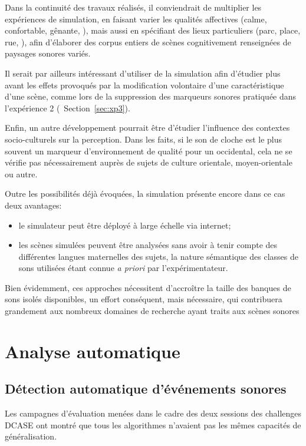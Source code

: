 Dans la continuité des travaux réalisés, il conviendrait de multiplier les expériences de simulation, en faisant varier les qualités affectives (calme, confortable, gênante, \etc), mais aussi en spécifiant des lieux particuliers (parc, place, rue, \etc), afin d'élaborer des corpus entiers de scènes cognitivement renseignées de paysages sonores variés. 

Il serait par ailleurs intéressant d'utiliser de la simulation afin d'étudier plus avant les effets provoqués par la modification volontaire d'une caractéristique d'une scène, comme lors de la suppression des marqueurs sonores pratiquée dans l'expérience 2 (\cf~Section~\ref{sec:xp3}).

Enfin, un autre développement pourrait être d'étudier l'influence des contextes socio-culturels sur la perception. Dans les faits, si le son de cloche est le plus souvent un marqueur d'environnement de qualité pour un occidental, cela ne se vérifie pas nécessairement auprès de sujets de culture orientale, moyen-orientale ou autre. 

Outre les possibilités déjà évoquées, la simulation présente encore dans ce cas deux avantages:

\begin{itemize}
\item le simulateur peut être déployé à large échelle via internet;
\item les scènes simulées peuvent être analysées sans avoir à tenir compte des différentes langues maternelles des sujets, la nature sémantique des classes de sons utilisées étant connue \emph{a priori} par l'expérimentateur.
\end{itemize}

Bien évidemment, ces approches nécessitent d'accroître la taille des banques de sons isolés disponibles, un effort conséquent, mais nécessaire, qui contribuera grandement aux nombreux domaines de recherche ayant traits aux scènes sonores

\section{Analyse automatique}

\subsection{Détection automatique d'événements sonores}

Les campagnes d'évaluation menées dans le cadre des deux sessions des challenges DCASE ont montré que tous les algorithmes n'avaient pas les mêmes capacités de généralisation.

